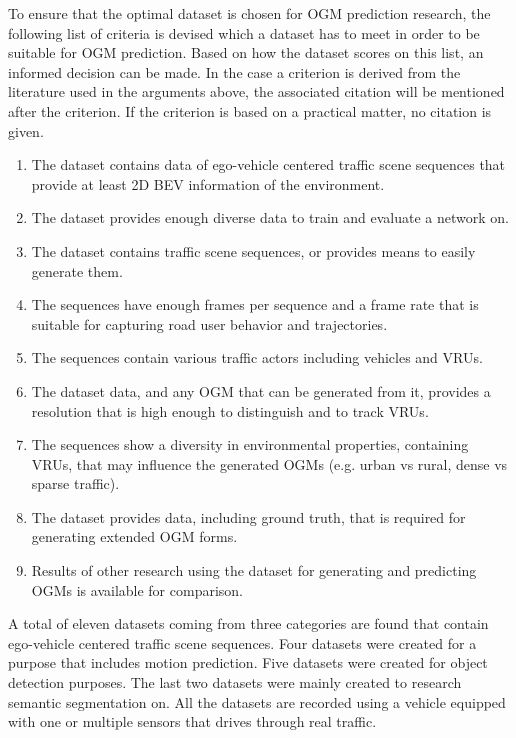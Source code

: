 To ensure that the optimal dataset is chosen for \gls{OGM} prediction research, the following list of criteria is devised which a dataset has to meet in order to be suitable for \gls{OGM} prediction. Based on how the dataset scores on this list, an informed decision can be made. In the case a criterion is derived from the literature used in the arguments above, the associated citation will be mentioned after the criterion. If the criterion is based on a practical matter, no citation is given.

\begin{enumerate}
	\item The dataset contains data of ego-vehicle centered traffic scene sequences that provide at least 2D \gls{BEV} information of the environment.
	\item The dataset provides enough diverse data to train and evaluate a network on. \cite{mehrabi2019survey} \cite{nordfjaern2014culture} \cite{torralba2011unbiased}
	\item The dataset contains traffic scene sequences, or provides means to easily generate them. 
	\item The sequences have enough frames per sequence and a frame rate that is suitable for capturing road user behavior and trajectories. \cite{chen2007review} \cite{lange2020attention}
	\item The sequences contain various traffic actors including vehicles and \glspl{VRU}. \cite{mehrabi2019survey}
	\item The dataset data, and any \gls{OGM} that can be generated from it, provides a resolution that is high enough to distinguish and to track \glspl{VRU}. 	
	\item The sequences show a diversity in environmental properties, containing \glspl{VRU}, that may influence the generated \glspl{OGM} (e.g. urban vs rural, dense vs sparse traffic). \cite{mehrabi2019survey} \cite{nordfjaern2014culture} 
	\item The dataset provides data, including ground truth, that is required for generating extended \gls{OGM} forms.
	\item Results of other research using the dataset for generating and predicting \glspl{OGM} is available for comparison. 
\end{enumerate}


A total of eleven datasets coming from three categories are found that contain ego-vehicle centered traffic scene sequences. Four datasets were created for a purpose that includes motion prediction. Five datasets were created for object detection purposes. The last two datasets were mainly created to research semantic segmentation on. All the datasets are recorded using a vehicle equipped with one or multiple sensors that drives through real traffic. \\


